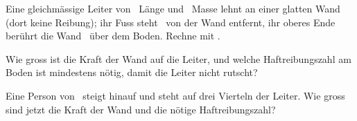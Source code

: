 Eine gleichmässige Leiter von \lLO\ Länge und \mLO\ Masse lehnt an einer glatten Wand (dort keine Reibung); ihr Fuss steht \aFO\ von der Wand entfernt, ihr oberes Ende berührt die Wand \hWO\ über dem Boden. Rechne mit \gO.

\begin{abcliste}
\abc
Wie gross ist die Kraft der Wand auf die Leiter, und welche Haftreibungszahl am Boden ist mindestens nötig, damit die Leiter nicht rutscht?

\abc
Eine Person von \MPO\ steigt hinauf und steht auf drei Vierteln der Leiter. Wie gross sind jetzt die Kraft der Wand und die nötige Haftreibungszahl?
\end{abcliste}
